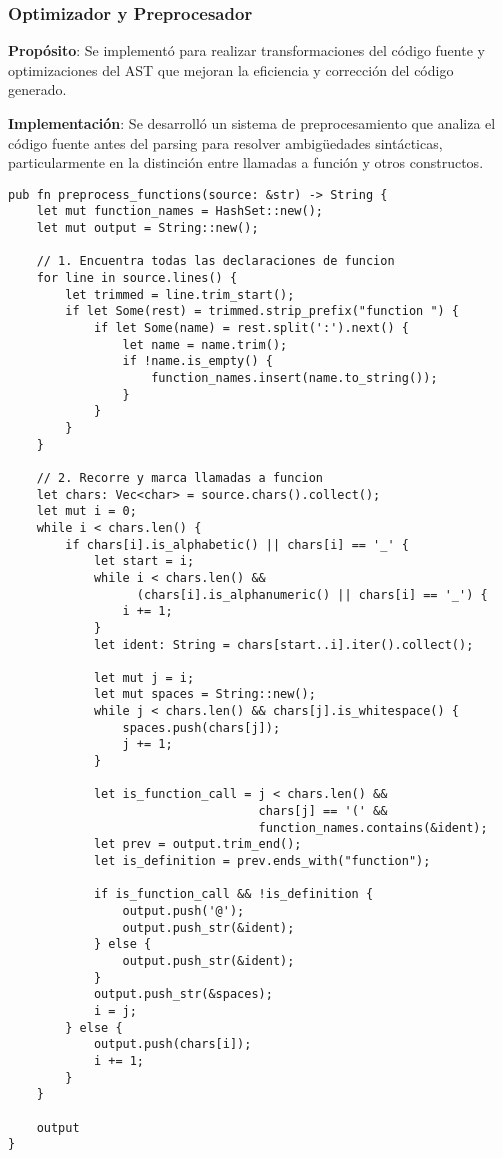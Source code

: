 \documentclass[12pt,a4paper]{article}
\begin{document}
\subsubsection{Optimizador y Preprocesador}

\textbf{Propósito}: Se implementó para realizar transformaciones del código fuente y optimizaciones del AST que mejoran la eficiencia y corrección del código generado.

\textbf{Implementación}: Se desarrolló un sistema de preprocesamiento que analiza el código fuente antes del parsing para resolver ambigüedades sintácticas, particularmente en la distinción entre llamadas a función y otros constructos.

\begin{lstlisting}[style=rustcode,caption=Preprocesador de funciones]
pub fn preprocess_functions(source: &str) -> String {
    let mut function_names = HashSet::new();
    let mut output = String::new();

    // 1. Encuentra todas las declaraciones de funcion
    for line in source.lines() {
        let trimmed = line.trim_start();
        if let Some(rest) = trimmed.strip_prefix("function ") {
            if let Some(name) = rest.split(':').next() {
                let name = name.trim();
                if !name.is_empty() {
                    function_names.insert(name.to_string());
                }
            }
        }
    }

    // 2. Recorre y marca llamadas a funcion
    let chars: Vec<char> = source.chars().collect();
    let mut i = 0;
    while i < chars.len() {
        if chars[i].is_alphabetic() || chars[i] == '_' {
            let start = i;
            while i < chars.len() && 
                  (chars[i].is_alphanumeric() || chars[i] == '_') {
                i += 1;
            }
            let ident: String = chars[start..i].iter().collect();

            let mut j = i;
            let mut spaces = String::new();
            while j < chars.len() && chars[j].is_whitespace() {
                spaces.push(chars[j]);
                j += 1;
            }

            let is_function_call = j < chars.len() && 
                                   chars[j] == '(' && 
                                   function_names.contains(&ident);
            let prev = output.trim_end();
            let is_definition = prev.ends_with("function");
            
            if is_function_call && !is_definition {
                output.push('@');
                output.push_str(&ident);
            } else {
                output.push_str(&ident);
            }
            output.push_str(&spaces);
            i = j;
        } else {
            output.push(chars[i]);
            i += 1;
        }
    }

    output
}
\end{lstlisting}
\end{document}
